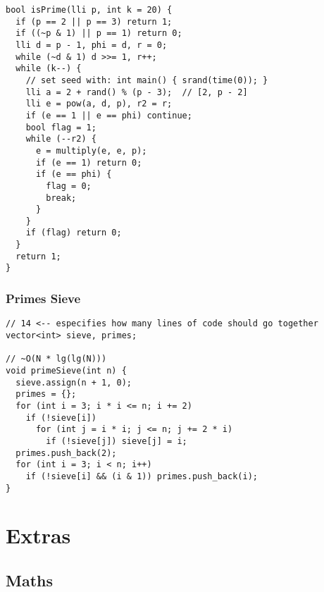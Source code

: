 \documentclass[twoside]{article}
\begin{document}
\begin{multicols*}{2}
\begin{verbatim}
bool isPrime(lli p, int k = 20) {
  if (p == 2 || p == 3) return 1;
  if ((~p & 1) || p == 1) return 0;
  lli d = p - 1, phi = d, r = 0;
  while (~d & 1) d >>= 1, r++;
  while (k--) {
    // set seed with: int main() { srand(time(0)); }
    lli a = 2 + rand() % (p - 3);  // [2, p - 2]
    lli e = pow(a, d, p), r2 = r;
    if (e == 1 || e == phi) continue;
    bool flag = 1;
    while (--r2) {
      e = multiply(e, e, p);
      if (e == 1) return 0;
      if (e == phi) {
        flag = 0;
        break;
      }
    }
    if (flag) return 0;
  }
  return 1;
}
\end{verbatim}

\subsubsectionfont{\large\bfseries\sffamily\underline}
\subsubsection*{Primes Sieve}
\begin{verbatim}
// 14 <-- especifies how many lines of code should go together
vector<int> sieve, primes;

// ~O(N * lg(lg(N)))
void primeSieve(int n) {
  sieve.assign(n + 1, 0);
  primes = {};
  for (int i = 3; i * i <= n; i += 2)
    if (!sieve[i])
      for (int j = i * i; j <= n; j += 2 * i)
        if (!sieve[j]) sieve[j] = i;
  primes.push_back(2);
  for (int i = 3; i < n; i++)
    if (!sieve[i] && (i & 1)) primes.push_back(i);
}
\end{verbatim}

\end{multicols*}
\sectionfont{\bfseries\sffamily\centering\Huge}
\vspace{1em}
\section*{Extras}
\vspace{3em}
\subsectionfont{\bfseries\sffamily\centering\LARGE}
\vspace{0em}
\subsection*{Maths}
\vspace{2em}
\subsubsectionfont{\large\bfseries\sffamily\underline}
\end{document}
